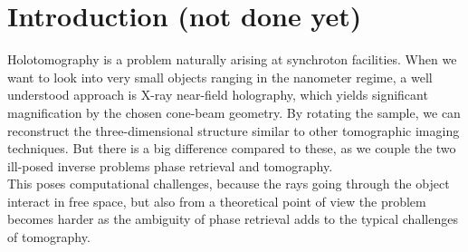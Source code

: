 \section{Introduction (not done yet)} \label{sec:Intro}

Holotomography is a problem naturally arising at synchroton facilities.
When we want to look into very small objects ranging in the nanometer regime, a well understood approach is X-ray near-field holography, which yields significant magnification by the chosen cone-beam geometry.
By rotating the sample, we can reconstruct the three-dimensional structure similar to other tomographic imaging techniques.
But there is a big difference compared to these, as we couple the two ill-posed inverse problems phase retrieval and tomography.
\\
This poses computational challenges, because the rays going through the object interact in free space, but also from a theoretical point of view the problem becomes harder as the ambiguity of phase retrieval adds to the typical challenges of tomography.

